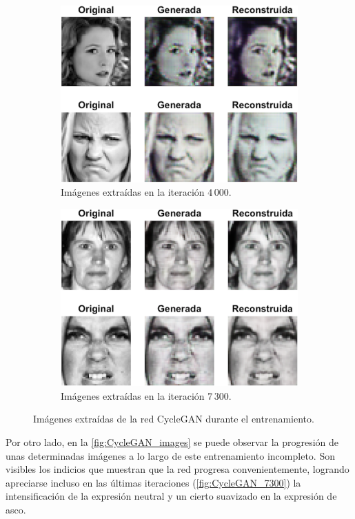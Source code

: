 \begin{figure}
    \vspace{1cm}
    \begin{subfigure}[t]{.45\textwidth}
      \centering
      \includegraphics[width=\linewidth]{Images/CycleGAN_4000.png}
      \caption{Imágenes extraídas en la iteración $4\,000$.}
      \label{fig:CycleGAN_4000}
    \end{subfigure}
    \hfill
    \begin{subfigure}[t]{.45\textwidth}
      \centering
      \includegraphics[width=\linewidth]{Images/CycleGAN_7300.png}
      \caption{Imágenes extraídas en la iteración $7\,300$.}
      \label{fig:CycleGAN_7300}
    \end{subfigure}
    \caption{Imágenes extraídas de la red CycleGAN durante el entrenamiento.}
    \label{fig:CycleGAN_images}
\end{figure}

Por otro lado, en la \autoref{fig:CycleGAN_images} se puede observar la progresión de unas determinadas imágenes a lo largo de este entrenamiento incompleto. Son visibles los indicios que muestran que la red progresa convenientemente, logrando apreciarse incluso en las últimas iteraciones (\autoref{fig:CycleGAN_7300}) la intensificación de la expresión neutral y un cierto suavizado en la expresión de asco.

